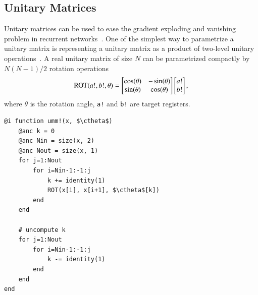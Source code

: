 \documentclass[aps,twocolumn,longbibliography,english,superscriptaddress]{revtex4-1}
\newcommand{\<}{\langle}
\renewcommand{\>}{\rangle}
\newcommand{\ctheta}{{\color{jlbase}{\rm \theta}}}
\newcommand{\Tr}{{\rm Tr}}
\theoremstyle{definition}\newtheorem{definition}{\textit{Definition}}
\begin{document}
\subsection{Unitary Matrices}\label{sec:umm}
Unitary matrices can be used to ease the gradient exploding and vanishing problem in recurrent networks~\cite{Arjovsky2015,Wisdom2016,Li2016}.
One of the simplest way to parametrize a unitary matrix is representing a unitary matrix as a product of two-level unitary operations~\cite{Li2016}. A real unitary matrix of size $N$ can be parametrized compactly by $N(N-1)/2$ rotation operations~\cite{Li2013}
\begin{align}
    {\rm ROT}(a!, b!, \theta)  = \begin{bmatrix}
        \cos(\theta) & - \sin(\theta)\\
        \sin(\theta)  & \cos(\theta)
    \end{bmatrix}
    \begin{bmatrix}
        a!\\
        b!
    \end{bmatrix},
\end{align}
where \texttt{$\theta$} is the rotation angle, \texttt{a!} and \texttt{b!} are target registers.

\begin{minipage}{.44\textwidth}
    \begin{lstlisting}[mathescape=true]
@i function umm!(x, $\ctheta$)
    @anc k = 0
    @anc Nin = size(x, 2)
    @anc Nout = size(x, 1)
    for j=1:Nout
        for i=Nin-1:-1:j
            k += identity(1)
            ROT(x[i], x[i+1], $\ctheta$[k])
        end
    end

    # uncompute k
    for j=1:Nout
        for i=Nin-1:-1:j
            k -= identity(1)
        end
    end
end
\end{lstlisting}
\end{minipage}

\end{document}
